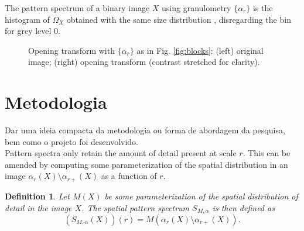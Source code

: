 \documentclass{sciposter}
\newtheorem{Def}{Definition}
\begin{document}
\begin{multicols}{3}
The pattern spectrum of a binary image $X$ using granulometry 
$\{\alpha_r\}$ is the histogram of $\Omega_X$ obtained with the same 
size distribution \cite{Nacken:thesis}, disregarding the bin for grey level 0.


\begin{figure}
\begin{center}
\end{center}
\caption{ \label{fig:opentransf} Opening transform with $\{\alpha_r\}$ as in 
 Fig. \ref{fig:blocks}: (left) original image; (right) opening transform
(contrast stretched for clarity). 
}
\end{figure}


\section{Metodologia}
Dar uma ideia compacta da metodologia ou forma de abordagem da pesquisa, bem como o projeto foi desenvolvido.
\\
Pattern spectra only retain the amount of detail present at  scale $r$.
This can be amended by computing some parameterization of the spatial 
distribution in an image $\alpha_r(X) \setminus \alpha_{r+}(X)$ as a function of $r$. 

\begin{Def}
Let ${M}(X)$ be some parameterization of the spatial distribution of detail
in the image $X$. The spatial pattern spectrum ${S}_{{M},\alpha}$ is
then defined as
\begin{equation}
  ({S}_{{M},\alpha}(X))(r) = {M}(\alpha_r(X) \setminus \alpha_{r+}(X)).
\end{equation}  
\end{Def}


\end{multicols}
\end{document}
